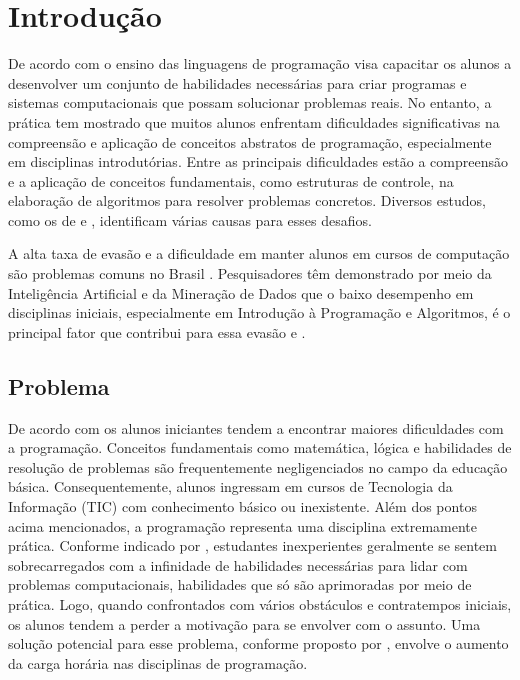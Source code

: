 \label{\part{title}}\chapter{Introdução}
\label{introducao}

De acordo com  o ensino das linguagens de programação visa capacitar os alunos a desenvolver um conjunto de habilidades necessárias para criar programas e sistemas computacionais que possam solucionar problemas reais. No entanto, a prática tem mostrado que muitos alunos enfrentam dificuldades significativas na compreensão e aplicação de conceitos abstratos de programação, especialmente em disciplinas introdutórias. Entre as principais dificuldades estão a compreensão e a aplicação de conceitos fundamentais, como estruturas de controle, na elaboração de algoritmos para resolver problemas concretos. Diversos estudos, como os de  e , identificam várias causas para esses desafios.

A alta taxa de evasão e a dificuldade em manter alunos em cursos de computação são problemas comuns no Brasil . Pesquisadores têm demonstrado por meio da Inteligência Artificial e da Mineração de Dados que o baixo desempenho em disciplinas iniciais, especialmente em Introdução à Programação e Algoritmos, é o principal fator que contribui para essa evasão  e .




\section{Problema}

De acordo com  os alunos iniciantes tendem a encontrar maiores dificuldades com a programação. Conceitos fundamentais como matemática, lógica e habilidades de resolução de problemas são frequentemente negligenciados no campo da educação básica. Consequentemente, alunos ingressam em cursos de Tecnologia da Informação (TIC) com conhecimento básico ou inexistente. Além dos pontos acima mencionados, a programação representa uma disciplina extremamente prática. Conforme indicado por , estudantes inexperientes geralmente se sentem sobrecarregados com a infinidade de habilidades necessárias para lidar com problemas computacionais, habilidades que só são aprimoradas por meio de  prática. Logo, quando confrontados com vários obstáculos e contratempos iniciais, os alunos tendem a perder a motivação para se envolver com o assunto. Uma solução potencial para esse problema, conforme proposto por , envolve o aumento da carga horária nas disciplinas de programação.

